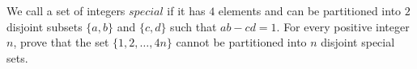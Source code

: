 We call a set of integers $\textit{special}$ if it has $4$ elements and can be partitioned into $2$ disjoint subsets $\{ a,b \}$ and $\{ c, d \}$ such that $ab - cd = 1$. For every positive integer $n$,  prove that the set $\{ 1, 2, \dots, 4n \}$ cannot be partitioned into $n$ disjoint special sets.